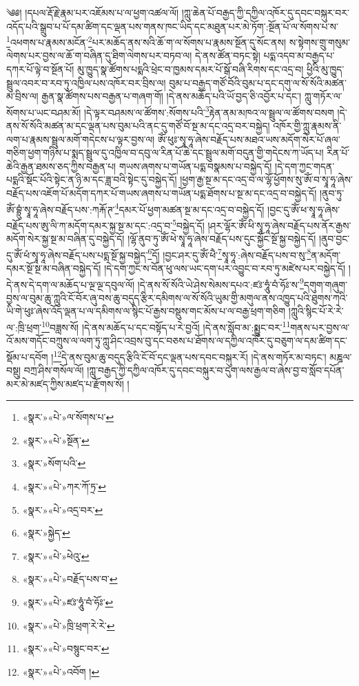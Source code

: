༄༅། །དཔལ་རྡོ་རྗེ་རྣམ་པར་འཇོམས་པ་ལ་ཕྱག་འཚལ་ལོ། །ཀླུ་ཆེན་པོ་བརྒྱད་ཀྱི་དཀྱིལ་འཁོར་དུ་དབང་བསྐུར་བར་འདོད་པའི་སྒྲུབ་པ་པོ་དམ་ཚིག་དང་ལྡན་པས་གནས་ཁང་ཡིད་དང་མཐུན་པར་མེ་ཏོག་:སྔོན་པོ་ལ་སོགས་པ་ས་\footnote{«སྣར་»«པེ་»ལ་སོགས་པ་}འཕགས་པ་རྣམས་མངོན་\footnote{«སྣར་»«པེ་»སྔོན་}པར་མཆོད་ནས་སའི་ཆོ་ག་ལ་སོགས་པ་རྣམས་སྔོན་དུ་སོང་ནས། ས་སྟེགས་གྲུ་གསུམ་ལེགས་པར་བྱས་ལ་ཆོ་ག་བཞིན་དུ་ཐིག་ལེགས་པར་བཏབ་ལ། དེ་ནས་ཚོན་བཏང་སྟེ། པདྨ་འདབ་མ་བརྒྱད་པ་དཀར་པོ་ལྟེ་བ་སྔོན་པོ། མུ་ཁྱུད་སྣ་ཚོགས་པདྨའི་ཕྲེང་བ་ཁྱམས་དམར་པོ་སྒོ་བཞི་རིགས་དང་འདྲ་བ། ཕྱིའི་མུ་ཁྱུད་སྦྲུལ་འབར་བ་རབ་ཏུ་འཁྱིལ་པས་འཁོར་བར་བྲིས་ལ། བུམ་པ་བརྒྱད་གཙོ་བོའི་བུམ་པ་དང་དགུ་ལ་སོ་སོའི་མཚན་མ་བྲིས་ལ། རྒྱན་སྣ་ཚོགས་པས་བརྒྱན་པ་གཞག་གོ། །དེ་ནས་མཆོད་པའི་ཡོ་བྱད་ཅི་འབྱོར་པ་དང་། ཀླུ་གཏོར་ལ་སོགས་པ་ཡང་བཤམ་མོ། །དེ་ལྟར་བཤམས་ལ་ཚོགས་:སོགས་པའི་\footnote{«སྣར་»སོག་པའི་}རྟེན་ནམ་མཁའ་ལ་སྦྲུལ་ལ་ཚོགས་བསག །དེ་ནས་སོ་སོའི་མཚན་མ་དང་ལྡན་པས་བུམ་པའི་ནང་དུ་གཙོ་བོ་སྔ་མ་དང་འདྲ་བར་བསྐྱེད། འཁོར་གྱི་ཀླུ་རྣམས་ནི་ལག་པ་རྣམས་སྦྲུལ་མགོ་གདེངས་པ་ལྟར་བྱས་ལ། ཨོཾ་ཕུཿ་སྭཱ་ཧཱ་ཞེས་བརྗོད་པས་མཐའ་ཡས་མདོག་སེར་པོ་ཞལ་གཅིག་ཕྱག་གཉིས་པ་སྨད་སྦྲུལ་དུ་འཁྱིལ་བ་དབུ་ལ་རིན་པོ་ཆེ་དང་སྦྲུལ་མགོ་བདུན་གྱི་གདེངས་ཀ་ཡོད་པ། རིན་པོ་ཆེའི་རྒྱན་ཐམས་ཅད་ཀྱིས་བརྒྱན་པ། གཡས་ཞགས་པ་གཡོན་པདྨ་བསྣམས་པ་བསྐྱེད་དོ། །དེ་དག་ཀྱང་གདན་པདྨའི་སྡོང་པོའི་སྟེང་ན་ཉི་མ་དང་ཟླ་བའི་སྟེང་དུ་བསྐྱེད་དོ། །ཕྱག་རྒྱ་སྔ་མ་དང་འདྲ་བ་ལ་ལྷོ་ཕྱོགས་སུ་ཨོཾ་བ་སྭཱ་ཧཱ་ཞེས་བརྗོད་པས་འཇོག་པོ་མདོག་དཀར་པོ་གཡས་ཞགས་པ་གཡོན་པདྨ་ཐོགས་པ་སྔ་མ་དང་འདྲ་བ་བསྐྱེད་དོ། །ནུབ་ཏུ་ཨོཾ་བྷྲུཾ་སྭཱ་ཧཱ་ཞེས་བརྗོད་པས་:ཀརྐོ་ཊ་\footnote{«སྣར་»«པེ་»ཀར་ཀོ་ཏྲ་}དམར་པོ་ཕྱག་མཚན་སྔ་མ་དང་འདྲ་བ་བསྐྱེད་དོ། །བྱང་དུ་ཨོཾ་ཕ་སྭཱ་ཧཱ་ཞེས་བརྗོད་པས་ཨུ་ལི་ཀ་མདོག་དམར་སྐྱ་སྔ་མ་དང་:འདྲ་བ་\footnote{«སྣར་»«པེ་»འདྲ་བར་}བསྐྱེད་དོ། །ཤར་ལྷོར་ཨོཾ་ཕི་སྭཱ་ཧཱ་ཞེས་བརྗོད་པས་ནོར་རྒྱས་མདོག་སེར་སྐྱ་སྔ་མ་བཞིན་དུ་བསྐྱེད་དོ། །ལྷོ་ནུབ་ཏུ་ཨོཾ་ཕེ་སྭཱ་ཧཱ་ཞེས་བརྗོད་པས་དུང་སྐྱོང་སྔོ་སྐྱ་བསྐྱེད་དོ། །ནུབ་བྱང་དུ་ཨོཾ་ཕཾ་སྭཱ་ཧཱ་ཞེས་བརྗོད་པས་པདྨ་སྔོ་སྐྱ་བསྐྱེད་\footnote{«སྣར་»སྐྱེད་}དོ། །བྱང་ཤར་དུ་ཨོཾ་ཕཻ་\footnote{«སྣར་»«པེ་»ཕེའུ་}སྭཱ་ཧཱ་:ཞེས་བརྗོད་པས་བ་སུ་\footnote{«སྣར་»«པེ་»བརྗོད་པས་བ་}ན་མདོག་དམར་སྔོ་སྔ་མ་བཞིན་བསྐྱེད་དོ། །དེ་དག་ཀྱང་ས་བོན་ཕུ་ལས་ཡང་དག་པར་འབྱུང་བ་རབ་ཏུ་མཛེས་པར་བསྐྱེད་དོ། །དེ་ནས་དེ་དག་ལ་མཆོད་པ་ལྔ་ལྔ་དབུལ་ལོ། །དེ་ནས་སོ་སོའི་ཡེ་ཤེས་སེམས་དཔའ་:ཛཿ་ཧཱུཾ་བཾ་ཧོཿ་ས་\footnote{«སྣར་»«པེ་»ཛཿ་ཧཱུཾ་བཾ་ཧོཿ་}དགུག་གཞུག་བྱས་ལ་བུམ་ཆུ་ཀླུའི་ངོ་བོར་ཞུ་བས་ཆུ་བདུད་རྩིར་དམིགས་ལ་སོ་སོའི་ཡུམ་གྱི་མགུལ་ནས་འཁྱུད་པའི་ཐུགས་ཀའི་ཡི་གེ་ཕུཿ་ཞེས་འོད་ལྡན་པ་ལ་དམིགས་ལ་སྙིང་པོ་རྒྱས་བསྡུས་གང་མོས་པ་ལ་བརྒྱ་ཕྲག་གཅིག །ཀླུའི་སྙིང་པོ་རེ་རེ་ལ་:ཁྲི་ཕྲག་\footnote{«སྣར་»«པེ་»ཁྲི་ཕྲག་རེ་རེ་}བཟླས་སོ། །དེ་ནས་མཆོད་པ་དང་བསྟོད་པ་རེ་བྱའོ། །དེ་ནས་སློབ་མ་:སྨྱུང་བར་\footnote{«སྣར་»«པེ་»བསྙུང་བར་}གནས་པར་བྱས་ལ་འོ་མས་གདོང་བཀྲུས་ལ་ལག་ཏུ་ཀླུ་ཤིང་འབྲས་བུ་དང་བཅས་པ་ཐོགས་ལ་དཀྱིལ་འཁོར་དུ་བཅུག་ལ་དམ་ཚིག་དང་སྡོམ་པ་དབོག །\footnote{«སྣར་»«པེ་»འབོག །}དེ་ནས་བུམ་ཆུ་བདུད་རྩིའི་ངོ་བོ་དང་ལྡན་པས་དབང་བསྐུར་རོ། །དེ་ནས་གཏོར་མ་བཏང་། མཎྜལ་བསྡུ། བཀྲ་ཤིས་གསོལ་ལོ། །ཀླུ་བརྒྱད་ཀྱི་དཀྱིལ་འཁོར་དུ་དབང་བསྐུར་བ་དུག་ལས་རྒྱལ་བ་ཞེས་བྱ་བ་སློབ་དཔོན་མར་མེ་མཛད་ཀྱིས་མཛད་པ་རྫོགས་སོ། ། 